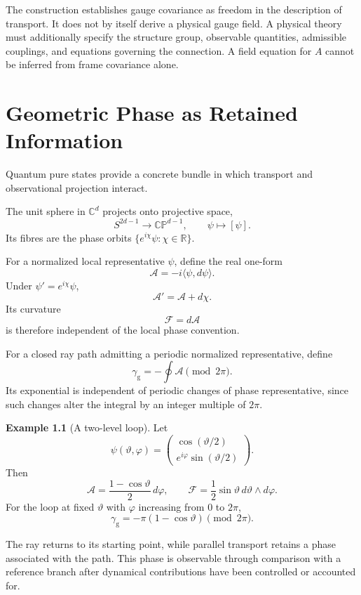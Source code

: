 \documentclass[11pt,oneside]{book}
\theoremstyle{definition}
\newtheorem{example}[theorem]{Example}
\theoremstyle{remark}
\newcommand{\R}{\mathbb{R}}
\begin{document}
The construction establishes gauge covariance as freedom in the
description of transport. It does not by itself derive a physical
gauge field. A physical theory must additionally specify the
structure group, observable quantities, admissible couplings,
and equations governing the connection. A field equation for $A$
cannot be inferred from frame covariance alone.


\chapter{Geometric Phase as Retained Information}

Quantum pure states provide a concrete bundle in which transport
and observational projection interact.

The unit sphere in $\mathbb C^d$ projects onto projective space,
\[
S^{2d-1}\longrightarrow\mathbb{CP}^{d-1},
\qquad
\psi\longmapsto[\psi].
\]
Its fibres are the phase orbits
$\{e^{i\chi}\psi:\chi\in\R\}$.

For a normalized local representative $\psi$, define the real
one-form
\[
\mathcal A=-i\langle\psi,d\psi\rangle.
\]
Under $\psi'=e^{i\chi}\psi$,
\[
\mathcal A'=\mathcal A+d\chi.
\]
Its curvature
\[
\mathcal F=d\mathcal A
\]
is therefore independent of the local phase convention.

For a closed ray path admitting a periodic normalized
representative, define
\[
\gamma_{\mathrm g}
=
-\oint\mathcal A
\pmod{2\pi}.
\]
Its exponential is independent of periodic changes of phase
representative, since such changes alter the integral by an
integer multiple of $2\pi$.

\begin{example}[A two-level loop]
Let
\[
\psi(\vartheta,\varphi)=
\begin{pmatrix}
\cos(\vartheta/2)\\
e^{i\varphi}\sin(\vartheta/2)
\end{pmatrix}.
\]
Then
\[
\mathcal A
=
\frac{1-\cos\vartheta}{2}\,d\varphi,
\qquad
\mathcal F
=
\frac12\sin\vartheta\,d\vartheta\wedge d\varphi.
\]
For the loop at fixed $\vartheta$ with $\varphi$ increasing from
$0$ to $2\pi$,
\[
\gamma_{\mathrm g}
=
-\pi(1-\cos\vartheta)
\pmod{2\pi}.
\]
\end{example}

The ray returns to its starting point, while parallel transport
retains a phase associated with the path. This phase is observable
through comparison with a reference branch after dynamical
contributions have been controlled or accounted for.
\end{document}
